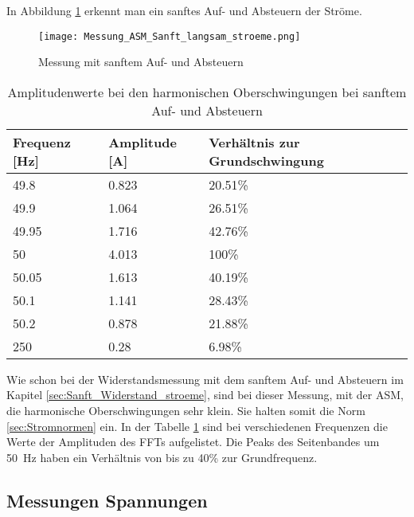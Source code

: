 In Abbildung \ref{fig:Mess_Sanft_langsam_stroeme} erkennt man ein sanftes Auf- und Absteuern der Ströme.

\begin{figure}[ht!]
	\centering
	\texttt{[image: Messung\_ASM\_Sanft\_langsam\_stroeme.png]}	
	\caption{Messung mit sanftem Auf- und Absteuern}\label{fig:Mess_Sanft_langsam_stroeme}
\end{figure}

\begin{table}[ht!]
	\centering
	\begin{tabular}{|l|l|l|}
		\hline
		Frequenz {[}Hz{]} & Amplitude {[}A{]} & Verhältnis zur Grundschwingung	\\ \hline
		49.8              & 0.823             & 20.51\%							\\ \hline
		49.9              & 1.064             & 26.51\%							\\ \hline
		49.95             & 1.716             & 42.76\%							\\ \hline
		50                & 4.013             & 100\%							\\ \hline
		50.05             & 1.613             & 40.19\%							\\ \hline
		50.1              & 1.141             & 28.43\%							\\ \hline
		50.2              & 0.878             & 21.88\%							\\ \hline
		250               & 0.28              & 6.98\%							\\ \hline
	\end{tabular}
	\caption{Amplitudenwerte bei den harmonischen Oberschwingungen bei sanftem Auf- und Absteuern}\label{tab:Sanft_langsam_ASM_stroeme}
\end{table}
Wie schon bei der Widerstandsmessung mit dem sanftem Auf- und Absteuern im Kapitel \ref{sec:Sanft_Widerstand_stroeme}, sind bei dieser Messung, mit der ASM, die harmonische Oberschwingungen sehr klein. Sie halten somit die Norm \ref{sec:Stromnormen} ein. In der Tabelle \ref{tab:Sanft_langsam_ASM_stroeme} sind bei verschiedenen Frequenzen die Werte der Amplituden des FFTs aufgelistet.
Die Peaks des Seitenbandes um \SI{50}{Hz} haben ein Verhältnis von bis zu 40\% zur Grundfrequenz.


\newpage
\subsection{Messungen Spannungen}

